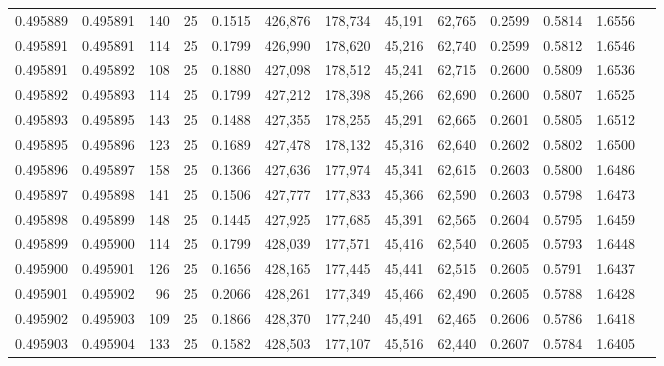 \begin{tabular}{rrrrrrrrrrrrr}
0.495889 & 0.495891 &   140 &  25 &                                     0.1515 & 426,876 & 178,734 &  45,191 &  62,765 & 0.2599 & 0.5814 & 1.6556 \\
0.495891 & 0.495891 &   114 &  25 &                                     0.1799 & 426,990 & 178,620 &  45,216 &  62,740 & 0.2599 & 0.5812 & 1.6546 \\
0.495891 & 0.495892 &   108 &  25 &                                     0.1880 & 427,098 & 178,512 &  45,241 &  62,715 & 0.2600 & 0.5809 & 1.6536 \\
0.495892 & 0.495893 &   114 &  25 &                                     0.1799 & 427,212 & 178,398 &  45,266 &  62,690 & 0.2600 & 0.5807 & 1.6525 \\
0.495893 & 0.495895 &   143 &  25 &                                     0.1488 & 427,355 & 178,255 &  45,291 &  62,665 & 0.2601 & 0.5805 & 1.6512 \\
0.495895 & 0.495896 &   123 &  25 &                                     0.1689 & 427,478 & 178,132 &  45,316 &  62,640 & 0.2602 & 0.5802 & 1.6500 \\
0.495896 & 0.495897 &   158 &  25 &                                     0.1366 & 427,636 & 177,974 &  45,341 &  62,615 & 0.2603 & 0.5800 & 1.6486 \\
0.495897 & 0.495898 &   141 &  25 &                                     0.1506 & 427,777 & 177,833 &  45,366 &  62,590 & 0.2603 & 0.5798 & 1.6473 \\
0.495898 & 0.495899 &   148 &  25 &                                     0.1445 & 427,925 & 177,685 &  45,391 &  62,565 & 0.2604 & 0.5795 & 1.6459 \\
0.495899 & 0.495900 &   114 &  25 &                                     0.1799 & 428,039 & 177,571 &  45,416 &  62,540 & 0.2605 & 0.5793 & 1.6448 \\
0.495900 & 0.495901 &   126 &  25 &                                     0.1656 & 428,165 & 177,445 &  45,441 &  62,515 & 0.2605 & 0.5791 & 1.6437 \\
0.495901 & 0.495902 &    96 &  25 &                                     0.2066 & 428,261 & 177,349 &  45,466 &  62,490 & 0.2605 & 0.5788 & 1.6428 \\
0.495902 & 0.495903 &   109 &  25 &                                     0.1866 & 428,370 & 177,240 &  45,491 &  62,465 & 0.2606 & 0.5786 & 1.6418 \\
0.495903 & 0.495904 &   133 &  25 &                                     0.1582 & 428,503 & 177,107 &  45,516 &  62,440 & 0.2607 & 0.5784 & 1.6405 \\

\end{tabular}
